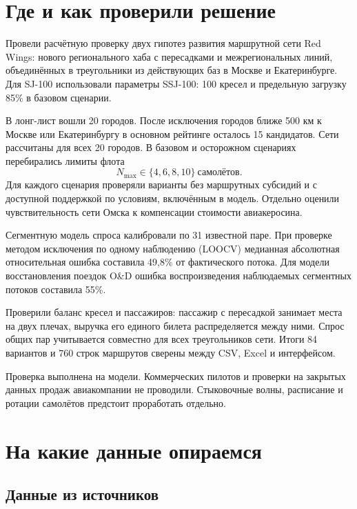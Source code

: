 \documentclass[11pt,a4paper]{article}
\begin{document}
\section{Где и как проверили решение}

Провели расчётную проверку двух гипотез развития маршрутной сети Red Wings:
нового регионального хаба с пересадками и межрегиональных линий,
объединённых в треугольники из действующих баз в Москве и Екатеринбурге.
Для SJ-100 использовали параметры SSJ-100: 100 кресел и предельную
загрузку 85\% в базовом сценарии.

В лонг-лист вошли 20 городов. После исключения городов ближе 500 км
к Москве или Екатеринбургу в основном рейтинге осталось 15 кандидатов.
Сети рассчитаны для всех 20 городов. В базовом и осторожном сценариях
перебирались лимиты флота
\[
    N_{\max}\in\{4,6,8,10\}\ \text{самолётов}.
\]
Для каждого сценария проверяли варианты без маршрутных субсидий
и с доступной поддержкой по условиям, включённым в модель.
Отдельно оценили чувствительность сети Омска к компенсации стоимости
авиакеросина.

Сегментную модель спроса калибровали по 31 известной паре.
При проверке методом исключения по одному наблюдению (LOOCV)
медианная абсолютная относительная ошибка составила 49,8\% от фактического
потока. Для модели восстановления поездок O\&D ошибка воспроизведения
наблюдаемых сегментных потоков составила 55\%.

Проверили баланс кресел и пассажиров: пассажир с пересадкой занимает
места на двух плечах, выручка его единого билета распределяется между ними.
Спрос общих пар учитывается совместно для всех треугольников сети.
Итоги 84 вариантов и 760 строк маршрутов сверены между CSV, Excel
и интерфейсом.

Проверка выполнена на модели. Коммерческих пилотов и проверки на закрытых
данных продаж авиакомпании не проводили. Стыковочные волны, расписание
и ротации самолётов предстоит проработать отдельно.

\section{На какие данные опираемся}

\subsection*{Данные из источников}
\end{document}
